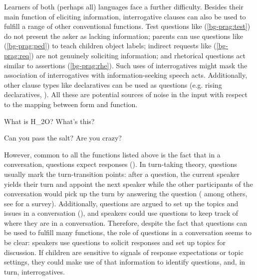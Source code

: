 Learners of both (perhaps all) languages face a further difficulty. Besides their main function of eliciting information, interrogative clauses can also be used to fulfill a range of other conventional functions. Test questions like (\ref{bg-prag:test}) do not present the asker as lacking information; parents can use questions like (\ref{bg-prag:ped}) to teach children object labels; indirect requests like (\ref{bg-prag:req}) are not genuinely soliciting information; and rhetorical questions act similar to assertions (\ref{bg-prag:rhe}). Such uses of interrogatives might mask the association of interrogatives with information-seeking speech acts. Additionally, other clause types like declaratives can be used as questions (e.g. rising declaratives, \citealt{gunlogson2004,gunlogson2008,jeong2018,rudin2018}). All these are potential sources of noise in the input with respect to the mapping between form and function.

\vspace{-2ex} 
\noindent
\begin{minipage}[t]{0.4\linewidth}	
\bxl\label{bg-prag:test}
What is H_{2}O?		\hfill {}
\ex \label{bg-prag:ped}
What's this?	\hfill {}
\exl
\eex
\end{minipage}
\hspace{1cm}
\begin{minipage}[t]{0.45\linewidth}
\bex{}
\bxl\label{bg-prag:req}
Can you pass the salt?			\hfill {}
\ex \label{bg-prag:rhe}
Are you crazy?	\hfill {}
\exl
\eex
\end{minipage}

\noindent However, common to all the functions listed above is the fact that in a conversation, questions expect responses (\citealt{duncan1972turn}). In turn-taking theory, questions usually mark the turn-transition points: after a question, the current speaker yields their turn and appoint the next speaker while the other participants of the conversation would pick up the turn by answering the question (\citealt{kendon1967gaze, argyle1972gaze, levinson1983, tice2011turn} among others, see \citealt{enfield2010} for a survey).  Additionally, questions are argued to set up the topics and issues in a conversation (\citealt{roberts2012,farkasbruce2010}), and speakers could use questions to keep track of where they are in a conversation. Therefore, despite the fact that questions can be used to fulfill many functions, the role of questions in a conversation seems to be clear: speakers use questions to solicit responses and set up topics for discussion. If children are sensitive to signals of response expectations or topic settings, they could make use of that information to identify questions, and, in turn, interrogatives. 

